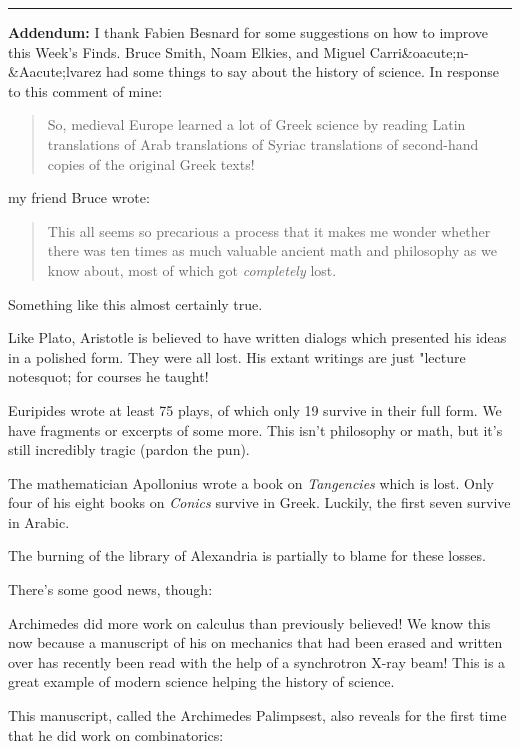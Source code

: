 \par\noindent\rule{\textwidth}{0.4pt}
\textbf{Addendum:} 
I thank Fabien Besnard for some suggestions on how to improve
this Week's Finds.  
Bruce Smith, Noam Elkies, and 
Miguel Carri&oacute;n-&Aacute;lvarez 
had some things to say about 
the history of science.  In response to this comment of mine:

\begin{quote}
So, medieval Europe learned a lot of Greek science by reading Latin 
translations of Arab translations of Syriac translations of 
second-hand copies of the original Greek texts!
\end{quote}

my friend Bruce wrote:

\begin{quote}
This all seems so precarious a process that it makes me wonder whether
there was ten times as much valuable ancient math and philosophy as we
know about, most of which got \emph{completely} lost.
\end{quote}

Something like this almost certainly true.  

Like Plato, Aristotle is believed to have written dialogs which presented 
his ideas in a polished form.  They were all lost.  His extant writings 
are just "lecture notesquot; for courses he taught!

Euripides wrote at least 75 plays, of which only 19 survive in their
full form.  We have fragments or excerpts of some more.  This isn't
philosophy or math, but it's still incredibly tragic (pardon the pun).

The mathematician Apollonius wrote a book on \emph{Tangencies} which is lost.
Only four of his eight books on \emph{Conics} survive in Greek.  
Luckily, the first seven survive in Arabic.  

The burning of the library of Alexandria is partially to blame for
these losses.

There's some good news, though:

Archimedes did more work on calculus than previously believed!
We know this now because a manuscript of his on mechanics that had been 
erased and written over has recently been read with the help of a 
synchrotron X-ray beam!  This is a great example of modern science
helping the history of science.  

This manuscript, called the Archimedes Palimpsest, also reveals for 
the first time that he did work on combinatorics:

